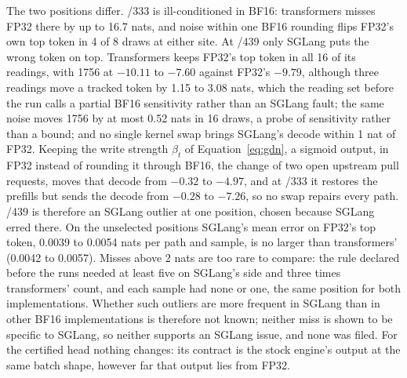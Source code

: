 The two positions differ. /333 is ill-conditioned in BF16: transformers misses FP32 there by up to 16.7 nats, and noise within one BF16 rounding flips FP32's own top token in 4 of 8 draws at either site. At /439 only SGLang puts the wrong token on top. Transformers keeps FP32's top token in all 16 of its readings, with 1756 at $-10.11$ to $-7.60$ against FP32's $-9.79$, although three readings move a tracked token by 1.15 to 3.08 nats, which the reading set before the run calls a partial BF16 sensitivity rather than an SGLang fault; the same noise moves 1756 by at most 0.52 nats in 16 draws, a probe of sensitivity rather than a bound; and no single kernel swap brings SGLang's decode within 1 nat of FP32. Keeping the write strength $\beta_t$ of Equation~\eqref{eq:gdn}, a sigmoid output, in FP32 instead of rounding it through BF16, the change of two open upstream pull requests, moves that decode from $-0.32$ to $-4.97$, and at /333 it restores the prefills but sends the decode from $-0.28$ to $-7.26$, so no swap repairs every path. /439 is therefore an SGLang outlier at one position, chosen because SGLang erred there. On the unselected positions SGLang's mean error on FP32's top token, 0.0039 to 0.0054 nats per path and sample, is no larger than transformers' (0.0042 to 0.0057). Misses above 2 nats are too rare to compare: the rule declared before the runs needed at least five on SGLang's side and three times transformers' count, and each sample had none or one, the same position for both implementations. Whether such outliers are more frequent in SGLang than in other BF16 implementations is therefore not known; neither miss is shown to be specific to SGLang, so neither supports an SGLang issue, and none was filed. For the certified head nothing changes: its contract is the stock engine's output at the same batch shape, however far that output lies from FP32.
